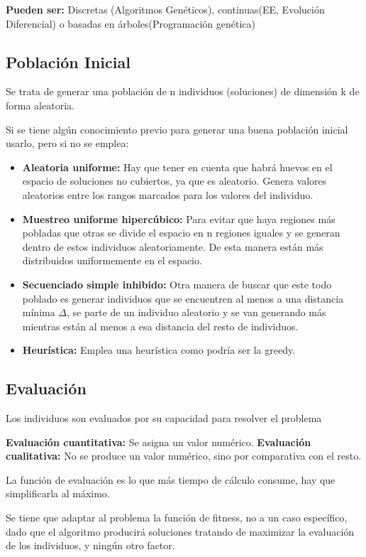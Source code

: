 \documentclass[12pt, twoside, openright]{report} %
\begin{document}
\textbf{Pueden ser:} Discretas (Algoritmos Genéticos), continuas(EE, Evolución Diferencial) o basadas en árboles(Programación genética)

\subsection{Población Inicial}
Se trata de generar una población de n individuos (soluciones) de dimensión k de forma aleatoria.

Si se tiene algún conocimiento previo para generar una buena población inicial usarlo, pero si no se emplea:
\begin{itemize}
	\item \textbf{Aleatoria uniforme:} Hay que tener en cuenta que habrá huevos en el espacio de soluciones no cubiertos, ya que es aleatorio. Genera valores aleatorios entre los rangos marcados para los valores del individuo.
	\item \textbf{Muestreo uniforme hipercúbico:} Para evitar que haya regiones más pobladas que otras se divide el espacio en n regiones iguales y se generan dentro de estos individuos aleatoriamente. De esta manera están más distribuidos uniformemente en el espacio.
	\item \textbf{Secuenciado simple inhibido:} Otra manera de buscar que este todo poblado es generar individuos que se encuentren al menos a una distancia mínima $\Delta$, se parte de un individuo aleatorio y se van generando más mientras están al menos a esa distancia del resto de individuos.
	\item \textbf{Heurística:} Emplea una heurística como podría ser la greedy.
\end{itemize}
\pagebreak

\subsection{Evaluación}
Los individuos son evaluados por su capacidad para resolver el problema

\textbf{Evaluación cuantitativa:} Se asigna un valor numérico.
\textbf{Evaluación cualitativa:} No se produce un valor numérico, sino por comparativa con el resto.

La función de evaluación es lo que más tiempo de cálculo consume, hay que simplificarla al máximo.

Se tiene que adaptar al problema la función de fitness, no a un caso específico, dado que el algoritmo producirá soluciones tratando de maximizar la evaluación de los individuos, y ningún otro factor.
\end{document}
